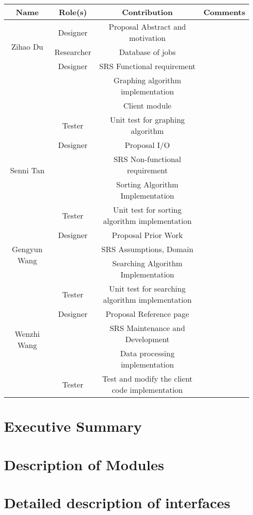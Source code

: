 \documentclass[12pt]{article}
\begin{document}
\begin{center}
\begin{tabular}{ |c|c|c|c| } 
\hline
Name & Role(s) & Contribution & Comments \\
\hline
\multirow{3}{4em}{Zihao Du} & Designer & Proposal Abstract and motivation & \\ 
& Researcher & Database of jobs & \\ 
& Designer & SRS Functional requirement  & \\ 
& ~ & Graphing algorithm implementation & \\
& ~ & Client module & \\
& Tester & Unit test for graphing algorithm & \\
\hline
\multirow{3}{4em}{Senni Tan} & Designer & Proposal I/O& \\ 
& ~ & SRS Non-functional requirement  & \\ 
& ~ & Sorting Algorithm Implementation & \\
& Tester & Unit test for sorting algorithm implementation & \\
\hline
\multirow{3}{4em}{Gengyun Wang} & Designer & Proposal Prior Work& \\ 
& ~ & SRS Assumptions, Domain  & \\ 
& ~ & Searching Algorithm Implementation & \\
& Tester & Unit test for searching algorithm implementation & \\
\hline
\multirow{3}{4em}{Wenzhi Wang} & Designer & Proposal Reference page& \\ 
& ~ & SRS  Maintenance and Development & \\ 
& ~ & Data processing implementation & \\
& Tester & Test and modify the client code implementation & \\
\hline
\end{tabular}
\end{center}

\newpage

\section*{Executive Summary}


\tableofcontents
\newpage

\section{Description of Modules}
\section{Detailed description of interfaces}
\end{document}
